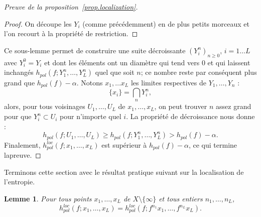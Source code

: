 \documentclass[11pt]{article}
\newtheorem{lemm}[theo]{Lemme}
\theoremstyle{definition}
\numberwithin{equation}{section}
\numberwithin{figure}{section}
\numberwithin{table}{section}
\begin{document}
\begin{proof}[Preuve de la proposition~\ref{prop.localization}]
\begin{proof}
On découpe les $Y_i$ (comme précédemment) en de plus petits morceaux et l'on recourt à la propriété de restriction.
\end{proof}

Ce sous-lemme permet de construire une suite décroissante $(Y_i^n)_{n \geq 0}$, $i=1 \dots L$ avec $Y_i^0 = Y_i$ et dont les éléments ont un diamètre qui tend vers $0$ et qui laissent inchangés $h_{pol}(f; Y_{1}^n, \dots, Y_{L}^n)$ quel que soit $n$; {ce nombre reste par conséquent plus grand que $h_{pol}(f)-\alpha$}. {Notons} $x_1, \dots x_L$ les limites respectives de $Y_1, \dots, Y_n$ :
\[
\{x_i\} = \bigcap_n Y_i^n,
\]
alors, pour tous voisinages $U_1, \dots, U_L$ de $x_1, \dots, x_L$, on peut trouver $n$ assez grand pour que $Y_i^n \subset U_i$ pour n'importe quel $i$. La propriété de décroissance nous donne :
\[
h_{pol}(f; U_{1}, \dots, U_{L}) \geq h_{pol}(f; Y_{1}^n, \dots, Y_{L}^n) > h_{pol}(f)-\alpha.
\]
Finalement, $h^{loc}_{pol}(f; x_{1}, \dots, x_{L})$ est supérieur à $h_{pol}(f)-\alpha$, {ce qui termine la\linebreak preuve}.
\end{proof}

Terminons cette section avec le résultat pratique suivant sur la localisation de l'entropie.

\begin{lemm}\label{lemm.iterates}
Pour tous points $x_1, \dots, x_L$ de $X \setminus\{\infty\}$ et tous entiers $n_{1}, \dots, n_{L}$,
\[
h^{loc}_{pol}(f;x_{1}, \dots, x_{L}) = h^{loc}_{pol}(f;f^{n_{1}}x_{1}, \dots, f^{n_{L}}x_{L}).
\]
\end{lemm}
\end{document}
